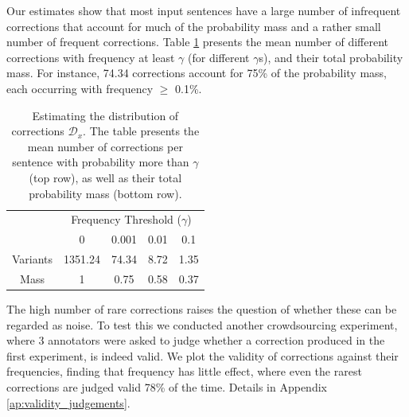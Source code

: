 \documentclass[11pt, a4paper]{article}
\begin{document}
Our estimates show that most input sentences have a large number of
infrequent corrections that account for much of the probability mass
and a rather small number of frequent corrections.
Table \ref{tab:corrections_dist} presents the mean number of different corrections with frequency at least $\gamma$ (for different $\gamma$s), and their total probability mass.
For instance, 74.34 corrections account for 75\% of the probability mass, each occurring with frequency $\geq$ 0.1\%.

\begin{table}[h!]
  \centering
  \small
  \singlespacing
  \begin{tabular}{c|c|c|c|c|}
    & \multicolumn{4}{c|}{Frequency Threshold ($\gamma$)}\\ 
    & \multicolumn{1}{c}{0} & \multicolumn{1}{c}{0.001} & \multicolumn{1}{c}{0.01} & \multicolumn{1}{c|}{0.1}
    \\
    \hline
    Variants & 1351.24 & 74.34 & 8.72 & 1.35
    \\
    Mass & 1 & 0.75 & 0.58 & 0.37\\
    \hline
  \end{tabular}
  \caption{\label{tab:corrections_dist}
    Estimating the distribution of corrections $\mathcal{D}_x$.
    The table presents the mean number of corrections per sentence with probability more than
    $\gamma$ (top row), as well as their total probability mass (bottom row).
  }
\end{table}

The high number of rare corrections raises the question of whether these can be regarded as noise.
To test this we conducted another crowdsourcing experiment, where 3 annotators were asked to judge whether a correction produced in the first experiment, is indeed valid.
We plot the validity of corrections against their frequencies, finding that frequency has little effect,
where even the rarest corrections are judged valid 78\% of the time.
Details in Appendix \ref{ap:validity_judgements}.

\end{document}
